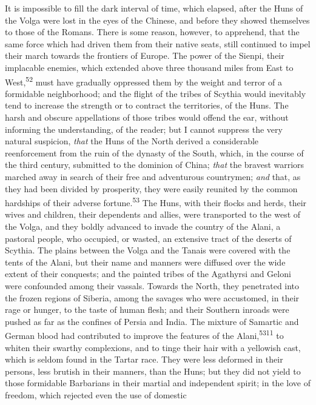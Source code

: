 It is impossible to fill the dark interval of time, which
elapsed, after the Huns of the Volga were lost in the eyes of the
Chinese, and before they showed themselves to those of the
Romans. There is some reason, however, to apprehend, that the
same force which had driven them from their native seats, still
continued to impel their march towards the frontiers of Europe.
The power of the Sienpi, their implacable enemies, which extended
above three thousand miles from East to West,\textsuperscript{52} must have
gradually oppressed them by the weight and terror of a formidable
neighborhood; and the flight of the tribes of Scythia would
inevitably tend to increase the strength or to contract the
territories, of the Huns. The harsh and obscure appellations of
those tribes would offend the ear, without informing the
understanding, of the reader; but I cannot suppress the very
natural suspicion, \textit{that} the Huns of the North derived a
considerable reenforcement from the ruin of the dynasty of the
South, which, in the course of the third century, submitted to
the dominion of China; \textit{that} the bravest warriors marched away
in search of their free and adventurous countrymen; \textit{and} that,
as they had been divided by prosperity, they were easily reunited
by the common hardships of their adverse fortune.\textsuperscript{53} The Huns,
with their flocks and herds, their wives and children, their
dependents and allies, were transported to the west of the Volga,
and they boldly advanced to invade the country of the Alani, a
pastoral people, who occupied, or wasted, an extensive tract of
the deserts of Scythia. The plains between the Volga and the
Tanais were covered with the tents of the Alani, but their name
and manners were diffused over the wide extent of their
conquests; and the painted tribes of the Agathyrsi and Geloni
were confounded among their vassals. Towards the North, they
penetrated into the frozen regions of Siberia, among the savages
who were accustomed, in their rage or hunger, to the taste of
human flesh; and their Southern inroads were pushed as far as the
confines of Persia and India. The mixture of Samartic and German
blood had contributed to improve the features of the Alani,\textsuperscript{5311}
to whiten their swarthy complexions, and to tinge their hair with
a yellowish cast, which is seldom found in the Tartar race. They
were less deformed in their persons, less brutish in their
manners, than the Huns; but they did not yield to those
formidable Barbarians in their martial and independent spirit; in
the love of freedom, which rejected even the use of domestic

